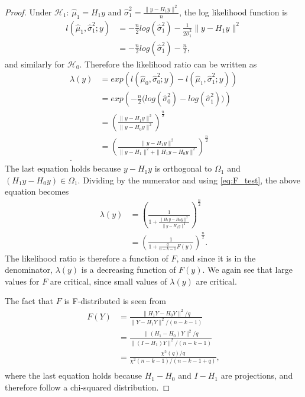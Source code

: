 \begin{proof}
    Under $\mathcal{H}_1$: $\hat{\mu}_1 = H_1 y$ and $\hat{\sigma}_1^2 = \frac{\| y - H_1 y \|^2}{n}$, the log likelihood function is
    \begin{align*}
        l(\hat{\mu}_1, \hat{\sigma}_1^2; y) &= -\frac{n}{2} log(\hat{\sigma}_1^2) - \frac{1}{2 \hat{\sigma}_1^2} \| y - H_1 y \|^2 \\
        &= -\frac{n}{2} log(\hat{\sigma}_1^2) - \frac{n}{2},
    \end{align*}
    and similarly for $\mathcal{H}_0$. Therefore the likelihood ratio can be written as
    \begin{align*}
        \lambda(y) &= exp \left( l(\hat{\mu}_0, \hat{\sigma}_0^2; y) - l(\hat{\mu}_1, \hat{\sigma}_1^2; y) \right) \\
        &= exp \left( -\frac{n}{2} \Big( log(\hat{\sigma}_0^2) - log(\hat{\sigma}_1^2)\Big) \right) \\
        &= \left( \frac{\| y - H_1 y \|^2}{\| y - H_0 y \|^2} \right)^{\frac{n}{2}} \\
        &= \left( \frac{\| y - H_1 y \|^2}{\| y - H_1 \|^2 + \| H_1 y - H_0 y \|^2} \right)^{\frac{n}{2}} \\.
    \end{align*}
    The last equation holds because $y - H_1 y$ is orthogonal to $\Omega_1$ and $(H_1 y - H_0 y) \in \Omega_1$. Dividing by the numerator and using \eqref{eq:F_test}, the above equation becomes
    \begin{align*}
        \lambda(y) &= \left( \frac{1}{1 + \frac{\| H_1 y - H_0 y \|^2}{\| y - H_1 y \|^2}} \right)^{\frac{n}{2}} \\
        &= \left( \frac{1}{1 + \frac{q}{n-k-1}F(y)}  \right)^{\frac{n}{2}}.
    \end{align*}
    The likelihood ratio is therefore a function of $F$, and since it is in the denominator, $\lambda(y)$ is a decreasing function of $F(y)$. We again see that large values for $F$ are critical, since small values of $\lambda(y)$ are critical.
    
    The fact that $F$ is F-distributed is seen from
    \begin{align*}
        F(Y) &= \frac{\| H_1 Y - H_0 Y \|^2/q}{\| Y - H_1 Y \|^2/(n-k-1)} \\
        &= \frac{\| (H_1 - H_0) Y \|^2/q}{\| (I - H_1) Y \|^2/(n-k-1)} \\
        &= \frac{\chi^2(q)/q}{\chi^2(n-k-1)/(n-k-1+q)}, \\
    \end{align*}
    where the last equation holds because $H_1 - H_0$ and $I - H_1$ are projections, and therefore follow a chi-squared distribution. 
\end{proof}

